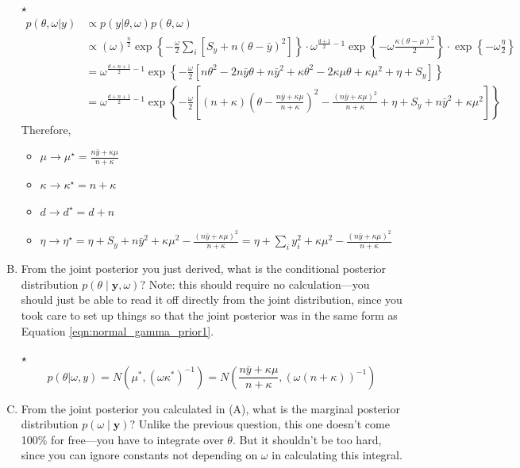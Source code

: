 \documentclass[11pt]{article}
\newcommand{\by}{\textbf{y}}
\newcommand{\jie}{$\star$ }
\begin{document}
\begin{enumerate}[(A)]
\bigskip
\jie
\begin{align*}
    p(\theta,\omega|y) &\propto p(y|\theta,\omega) p(\theta,\omega) \\
    &\propto (\omega)^{\frac{n}{2}} \exp\left\{ -\frac{\omega}{2} \sum_i [S_y + n(\theta - \bar{y})^2] \right\} \cdot \omega^{\frac{d+1}{2}-1} \exp \left\{ -\omega \frac{\kappa (\theta-\mu)^2}{2} \right\} \cdot \exp \left\{ -\omega \frac{\eta}{2} \right\} \\
    & = \omega^{\frac{d+n+1}{2}-1} \exp\left\{ -\frac{\omega}{2} [n\theta^2 - 2n \bar{y}\theta + n\bar{y}^2 + \kappa \theta^2 - 2\kappa \mu \theta + \kappa \mu^2 + \eta + S_y] \right\} \\
    & = \omega^{\frac{d+n+1}{2}-1} \exp\left\{ -\frac{\omega}{2} [(n+\kappa)(\theta - \frac{n\bar{y} + \kappa \mu}{n+\kappa})^2 - \frac{(n\bar{y} + \kappa \mu)^2}{n+\kappa} + \eta + S_y +n\bar{y}^2 + \kappa \mu^2] \right\}
\end{align*}
Therefore,
\begin{itemize}
\item $\mu \longrightarrow \mu^\star =  \frac{n\bar{y} + \kappa \mu}{n+\kappa}$
\item $\kappa \longrightarrow \kappa^\star = n + \kappa$
\item $d \longrightarrow d^{\star} =  d+n$
\item $\eta \longrightarrow \eta^\star = \eta + S_y +n\bar{y}^2 + \kappa \mu^2 - \frac{(n\bar{y} + \kappa \mu)^2}{n+\kappa} = \eta +\sum_i y_i^2 + \kappa \mu^2 - \frac{(n\bar{y} + \kappa \mu)^2}{n+\kappa}$
\end{itemize}

\item From the joint posterior you just derived, what is the conditional posterior distribution $p(\theta \mid \by, \omega)$?  Note: this should require no calculation---you should just be able to read it off directly from the joint distribution, since you took care to set up things so that the joint posterior was in the same form as Equation \ref{eqn:normal_gamma_prior1}.

\bigskip
\jie
$$p(\theta|\omega,y) = N(\mu^*, (\omega\kappa^*)^{-1}) = N(\frac{n\bar{y} + \kappa \mu}{n+\kappa}, (\omega(n + \kappa))^{-1})$$
\bigskip

\item From the joint posterior you calculated in (A), what is the marginal posterior distribution $p(\omega \mid \by)$?  Unlike the previous question, this one doesn't come 100\% for free---you have to integrate over $\theta$.  But it shouldn't be too hard, since you can ignore constants not depending on $\omega$ in calculating this integral.


\end{enumerate}
\end{document}
